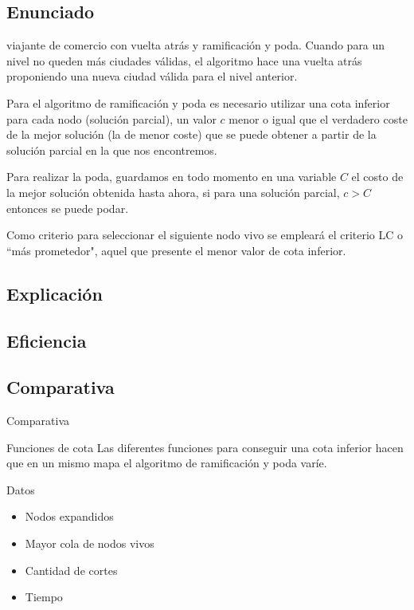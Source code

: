\subsection{Enunciado}
\begin{frame}
	\begin{block}{viajante de comercio con vuelta atrás y ramificación y poda.}
	Cuando para un nivel no queden más ciudades válidas, el algoritmo hace una vuelta atrás 
	proponiendo una nueva ciudad válida para el nivel anterior.

	Para el algoritmo de ramificación y poda es necesario utilizar una cota inferior para cada nodo 
	(solución parcial), un valor $c$ menor o igual que el verdadero coste de la mejor solución (la de 
	menor coste) que se puede obtener a partir de la solución parcial en la que nos encontremos.

	Para realizar la poda, guardamos en todo momento en una variable $C$ el costo de la mejor solución
	obtenida hasta ahora, si para una solución parcial, $c>C$ entonces se puede podar.

	Como criterio para seleccionar el siguiente nodo vivo se empleará el criterio LC o 
	``más prometedor", aquel que presente el menor valor de cota inferior.
	\end{block}
\end{frame}


\subsection{Explicación}
\begin{frame}

\end{frame}


\subsection{Eficiencia}
\begin{frame}

\end{frame}


\subsection{Comparativa}
\begin{frame}{Comparativa}
	\begin{block}{Funciones de cota}
	Las diferentes funciones para conseguir una cota inferior hacen que en un mismo mapa
	el algoritmo de ramificación y poda varíe. 
	\end{block}
	
	\begin{exampleblock}{Datos}
	\begin{itemize}
		\item Nodos expandidos
		\item Mayor cola de nodos vivos
		\item Cantidad de cortes
		\item Tiempo
	\end{itemize}
	\end{exampleblock}
\end{frame}



